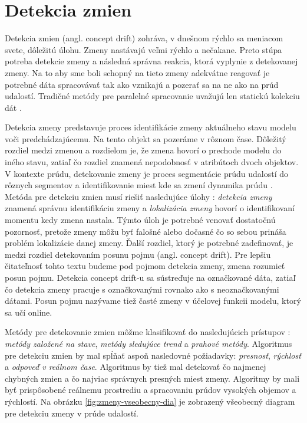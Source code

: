 \section{Detekcia zmien}
Detekcia zmien (angl. concept drift) zohráva, v dnešnom rýchlo sa meniacom svete, dôležitú úlohu. Zmeny nastávajú veľmi rýchlo a nečakane. Preto stúpa potreba detekcie zmeny a následná správna reakcia, ktorá vyplynie z detekovanej zmeny. Na to aby sme boli schopný na tieto zmeny adekvátne reagovať je potrebné dáta spracovávať tak ako vznikajú a pozerať sa na ne ako na prúd udalostí. Tradičné metódy pre paralelné spracovanie uvažujú len statickú kolekciu dát \citep{tran2014change}. \par
Detekcia zmeny predstavuje proces identifikácie zmeny aktuálneho stavu modelu voči predchádzajúcemu. Na tento objekt sa pozeráme v rôznom čase. Dôležitý rozdiel medzi zmenou a rozdielom je, že zmena hovorí o prechode modelu do iného stavu, zatiaľ čo rozdiel znamená nepodobnosť v atribútoch dvoch objektov. V kontexte prúdu, detekovanie zmeny je proces segmentácie prúdu udalostí do rôznych segmentov a identifikovanie miest kde sa zmení dynamika prúdu \citep{ross2009online}. Metóda pre detekciu zmien musí riešiť nasledujúce úlohy \citep{tran2014change}: \textit{detekcia zmeny} znamená správnu identifikáciu zmeny a \textit{lokalizácia zmeny} hovorí o identifikovaní momentu kedy zmena nastala. Týmto úloh je potrebné venovať dostatočnú pozornosť, pretože zmeny môžu byť falošné alebo dočasné čo so sebou prináša problém lokalizácie danej zmeny. Ďalší rozdiel, ktorý je potrebné zadefinovať, je medzi rozdiel detekovaním posunu pojmu (angl. concept drift). Pre lepšiu čitateľnosť tohto textu budeme pod pojmom detekcia zmeny, zmena rozumieť posun pojmu. Detekcia concept drift-u sa sústreďuje na označkované dáta, zatiaľ čo detekcia zmeny pracuje s označkovanými rovnako ako s neoznačkovanými dátami. Posun pojmu nazývame tiež časté zmeny v účelovej funkcii modelu, ktorý sa učí online. \par

Metódy pre detekovanie zmien môžme klasifikovať do nasledujúcich prístupov \citep{liu2010mining}: \textit{metódy založené na stave}, \textit{metódy sledujúce trend} a \textit{prahové metódy}. Algoritmus pre detekciu zmien by mal spĺňať aspoň nasledovné požiadavky: \textit{presnosť}, \textit{rýchlosť} a \textit{odpoveď v reálnom čase}. Algoritmus by tiež mal detekovať čo najmenej chybných zmien a čo najviac správnych presných miest zmeny. Algoritmy by mali byť prispôsobené reálnemu prostrediu a spracovaniu prúdov vysokých objemov a rýchlostí. Na obrázku \ref{fig:zmeny-vseobecny-dia} je zobrazený všeobecný diagram pre detekciu zmeny v prúde udalostí.

